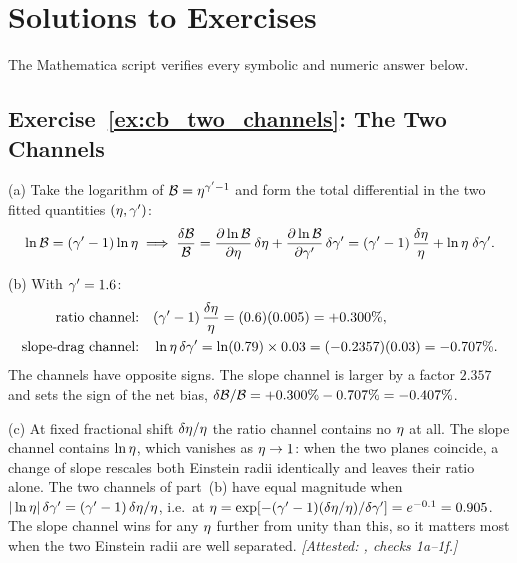 
\section{Solutions to Exercises}
\label{sec:cb_solutions}

\noindent
The Mathematica script
verifies every symbolic and numeric answer below.

\subsection*{Exercise~\ref{ex:cb_two_channels}: The Two Channels}

(a) Take the logarithm of $\mathcal{B}=\eta^{\gamma'-1}$ and form the
total differential in the two fitted quantities $(\eta,\gamma')$:
\begin{equation*}
  \ln\mathcal{B}=(\gamma'-1)\ln\eta
  \;\Longrightarrow\;
  \frac{\delta\mathcal{B}}{\mathcal{B}}
  =\frac{\partial \ln\mathcal{B}}{\partial \eta}\,\delta\eta+\frac{\partial \ln\mathcal{B}}{\partial \gamma'}\,\delta\gamma'
  =(\gamma'-1)\,\frac{\delta\eta}{\eta}+\ln\eta\;\delta\gamma' .
\end{equation*}

(b) With $\gamma'=1.6$:
\begin{align*}
  \text{ratio channel:}\quad &(\gamma'-1)\,\frac{\delta\eta}{\eta}=(0.6)(0.005)=+0.300\%,\\
  \text{slope-drag channel:}\quad &\ln\eta\,\delta\gamma'=\ln(0.79)\times0.03=(-0.2357)(0.03)=-0.707\%.
\end{align*}
The channels have opposite signs. The slope channel is larger by a
factor $2.357$ and sets the sign of the net bias,
$\delta\mathcal{B}/\mathcal{B}=+0.300\%-0.707\%=-0.407\%$.

(c) At fixed fractional shift $\delta\eta/\eta$ the ratio
channel contains no $\eta$ at all. The slope channel contains
$\ln\eta$, which vanishes as $\eta\to1$: when the two planes
coincide, a change of slope rescales both Einstein radii identically and
leaves their ratio alone. The two channels of part~(b) have equal
magnitude when $|\ln\eta|\,\delta\gamma'=(\gamma'-1)\,\delta\eta/\eta$,
i.e.\ at
$\eta=\exp[-(\gamma'-1)(\delta\eta/\eta)/\delta\gamma']=e^{-0.1}=0.905$.
The slope channel wins for any $\eta$ further from unity than this,
so it matters most when the two Einstein radii are well separated.
\emph{[Attested: ,
checks 1a--1f.]}

